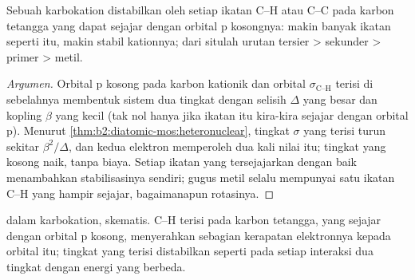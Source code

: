 \begin{proposition}\label{prop:b2:fragment-orbitals:hyperconjugation}
Sebuah karbokation distabilkan oleh setiap ikatan C--H atau C--C pada
karbon tetangga yang dapat sejajar dengan orbital p kosongnya: makin
banyak ikatan seperti itu, makin stabil kationnya; dari situlah urutan
tersier > sekunder > primer > metil.
\end{proposition}

\begin{proof}[Argumen]
Orbital p kosong pada karbon kationik dan orbital $\sigma_{\text{C--H}}$ terisi
di sebelahnya membentuk sistem dua tingkat dengan selisih $\Delta$ yang
besar dan kopling $\beta$ yang kecil (tak nol hanya jika ikatan itu kira-kira
sejajar dengan orbital p). Menurut \cref{thm:b2:diatomic-mos:heteronuclear},
tingkat $\sigma$ yang terisi turun sekitar $\beta^2/\Delta$, dan kedua
elektron memperoleh dua kali nilai itu; tingkat yang kosong naik, tanpa
biaya. Setiap ikatan yang tersejajarkan dengan baik menambahkan
stabilisasinya sendiri; gugus metil selalu mempunyai satu ikatan C--H yang
hampir sejajar, bagaimanapun rotasinya.
\end{proof}

\begin{omfigure}

{\small {} dalam karbokation, skematis.  C--H
terisi pada karbon tetangga, yang sejajar dengan orbital p kosong,
menyerahkan sebagian kerapatan elektronnya kepada orbital itu; tingkat yang
terisi distabilkan seperti pada setiap interaksi dua tingkat dengan energi
yang berbeda.}
\end{omfigure}

